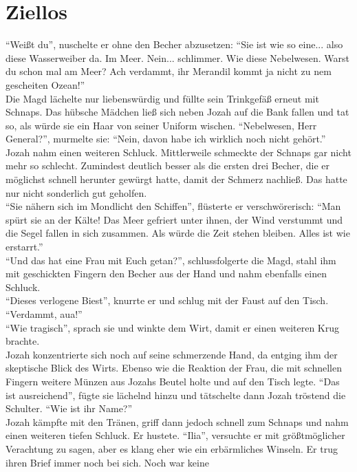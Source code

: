 \chapter{Ziellos}

``Weißt du'', nuschelte er ohne den Becher abzusetzen: ``Sie ist wie so eine... also diese 
Wasserweiber da. Im Meer. Nein... schlimmer. Wie diese Nebelwesen. Warst du schon mal am Meer? Ach 
verdammt, ihr Merandil kommt ja nicht zu nem gescheiten Ozean!''\\
Die Magd lächelte nur liebenswürdig und füllte sein Trinkgefäß erneut mit Schnaps. Das hübsche 
Mädchen ließ sich neben Jozah auf die Bank fallen und tat so, als würde sie ein Haar von seiner 
Uniform wischen. ``Nebelwesen, Herr General?'', murmelte sie: ``Nein, davon habe ich wirklich noch 
nicht gehört.''\\
Jozah nahm einen weiteren Schluck. Mittlerweile schmeckte der Schnaps gar nicht mehr so schlecht. 
Zumindest deutlich besser als die ersten drei Becher, die er möglichst schnell herunter gewürgt 
hatte, damit der Schmerz nachließ. Das hatte nur nicht sonderlich gut geholfen.\\
``Sie nähern sich im Mondlicht den Schiffen'', flüsterte er verschwörerisch: ``Man spürt sie an der 
Kälte! Das Meer gefriert unter ihnen, der Wind verstummt und die Segel fallen in sich zusammen. Als 
würde die Zeit stehen bleiben. Alles ist wie erstarrt.''\\
``Und das hat eine Frau mit Euch getan?'', schlussfolgerte die Magd, stahl ihm mit geschickten 
Fingern den Becher aus der Hand und nahm ebenfalls einen Schluck.\\
``Dieses verlogene Biest'', knurrte er und schlug mit der Faust auf den Tisch. ``Verdammt, aua!''\\
``Wie tragisch'', sprach sie und winkte dem Wirt, damit er einen weiteren Krug brachte.\\
Jozah konzentrierte sich noch auf seine schmerzende Hand, da entging ihm der skeptische Blick des 
Wirts. Ebenso wie die Reaktion der Frau, die mit schnellen Fingern weitere Münzen aus Jozahs Beutel 
holte und auf den Tisch legte. ``Das ist ausreichend'', fügte sie lächelnd hinzu und tätschelte 
dann Jozah tröstend die Schulter. ``Wie ist ihr Name?''\\
Jozah kämpfte mit den Tränen, griff dann jedoch schnell zum Schnaps und nahm einen weiteren tiefen 
Schluck. Er hustete. ``Ilia'', versuchte er mit größtmöglicher Verachtung zu sagen, aber es klang 
eher wie ein erbärmliches Winseln. Er trug ihren Brief immer noch bei sich. Noch war keine 
